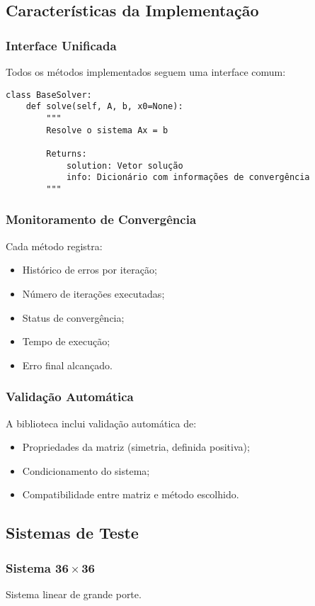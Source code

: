 \documentclass[12pt,a4paper]{article}
\begin{document}
\subsection{Características da Implementação}

\subsubsection*{Interface Unificada}
Todos os métodos implementados seguem uma interface comum:
\begin{verbatim}
class BaseSolver:
    def solve(self, A, b, x0=None):
        """
        Resolve o sistema Ax = b
        
        Returns:
            solution: Vetor solução
            info: Dicionário com informações de convergência
        """
\end{verbatim}

\subsubsection*{Monitoramento de Convergência}
Cada método registra:
\begin{itemize}
  \item Histórico de erros por iteração;
  \item Número de iterações executadas;
  \item Status de convergência;
  \item Tempo de execução;
  \item Erro final alcançado.
\end{itemize}

\subsubsection*{Validação Automática}
A biblioteca inclui validação automática de:
\begin{itemize}
  \item Propriedades da matriz (simetria, definida positiva);
  \item Condicionamento do sistema;
  \item Compatibilidade entre matriz e método escolhido.
\end{itemize}

\subsection{Sistemas de Teste}

\subsubsection*{Sistema 36\,$\times$\,36}
Sistema linear de grande porte.
\end{document}
